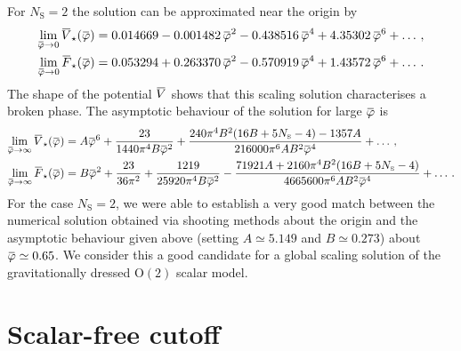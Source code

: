 \documentclass[11pt]{book}
\newcommand{\overbar}[1]{\mkern 1.5mu\overline{\mkern-1.5mu#1\mkern-1.5mu}\mkern 1.5mu}
\newcommand\NS{ N_{\scriptscriptstyle{\mathrm{S}}} }
\newcommand{\bV}{\overbar V}
\newcommand{\bF}{\overbar F}
\newcommand{\bVstar}{\bV_\star}
\newcommand{\bFstar}{\bF_\star}
\newcommand{\bp}{\overbar \varphi}
\numberwithin{equation}{chapter}
\begin{document}

\noindent For $\NS=2$ the solution can be approximated near the origin by
\begin{align}
  \lim_{\bp \rightarrow 0} \bVstar(\bp) &= 0.014669 - 0.001482 \, \bp ^2 - 0.438516 \, \bp ^4 + 4.35302 \, \bp ^6 + \dots \,, \\
  \lim_{\bp \rightarrow 0} \bFstar(\bp) &= 0.053294 + 0.263370 \, \bp ^2 - 0.570919 \, \bp ^4 + 1.43572 \, \bp ^6 + \dots \,.
\end{align}
The shape of the potential $\bV$ shows that this scaling solution characterises a broken phase.
The asymptotic behaviour of the solution for large $\bp$ is
\begin{align}
  \lim_{\bp \rightarrow \infty} \bVstar(\bp) &= A \bp ^6 + \frac{23}{1440 \pi ^4 B \bp ^2}
                     + \frac{240 \pi ^4 B^2 (16 B+5 \NS-4)-1357 A}{216000 \pi ^6 A B^2 \bp ^4} + \dots \,, \\
  \lim_{\bp \rightarrow \infty} \bFstar(\bp) &= B \bp ^2 + \frac{23}{36 \pi ^2}+\frac{1219}{25920 \pi ^4 B \bp ^2}
                     - \frac{71921 A+2160 \pi ^4 B^2 (16 B+5 \NS-4)}{4665600 \pi ^6 A B^2 \bp ^4} + \dots \,.
\end{align}
For the case $\NS=2$, we were able to establish a very good match between the numerical solution
obtained via shooting methods about the origin and the asymptotic behaviour given above
(setting $A\simeq 5.149$ and $B\simeq 0.273$) about $\bp\simeq0.65$.
We consider this a good candidate for a global scaling solution of the gravitationally
dressed ${\mathrm O(2)}$ scalar model.


\section{Scalar-free cutoff}
\label{sec:purecutoff}
\end{document}
